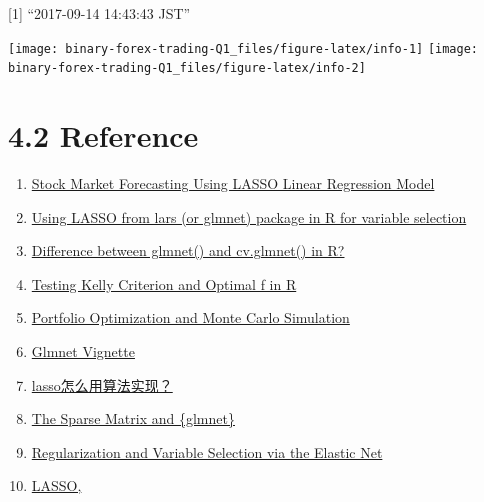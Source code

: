 \documentclass[]{tufte-book}
\providecommand{\tightlist}{%
  \setlength{\itemsep}{0pt}\setlength{\parskip}{0pt}}
\begin{document}
{[}1{]} ``2017-09-14 14:43:43 JST''

\texttt{[image: binary-forex-trading-Q1\_files/figure-latex/info-1]}
\texttt{[image: binary-forex-trading-Q1\_files/figure-latex/info-2]}

\section{4.2 Reference}\label{reference}

\begin{enumerate}
\def\labelenumi{\arabic{enumi}.}
\tightlist
\item
  \href{https://github.com/englianhu/binary.com-interview-question/blob/master/reference/Stock\%20Market\%20Forecasting\%20Using\%20LASSO\%20Linear\%20Regression\%20Model.pdf}{{Stock
  Market Forecasting Using LASSO Linear Regression Model}}
\item
  \href{http://stats.stackexchange.com/questions/58531/using-lasso-from-lars-or-glmnet-package-in-r-for-variable-selection?answertab=votes\#tab-top}{{Using
  LASSO from lars (or glmnet) package in R for variable selection}}
\item
  \href{https://stackoverflow.com/questions/29311323/difference-between-glmnet-and-cv-glmnet-in-r?answertab=votes\#tab-top}{{Difference
  between glmnet() and cv.glmnet() in R?}}
\item
  \href{https://alphaism.wordpress.com/2012/04/13/testing-kelly-criterion-and-optimal-f-in-r}{{Testing
  Kelly Criterion and Optimal f in R}} 
\item
  \href{https://github.com/scibrokes/kelly-criterion/blob/master/references/Portfolio\%20Optimization\%20and\%20Monte\%20Carlo\%20Simulation.pdf}{{Portfolio
  Optimization and Monte Carlo Simulation}} 
\item
  \href{https://web.stanford.edu/~hastie/glmnet/glmnet_alpha.html}{{Glmnet
  Vignette}}
\item
  \href{http://cos.name/cn/topic/101533/\#post-418215}{{lasso怎么用算法实现？}}
\item
  \href{http://amunategui.github.io/sparse-matrix-glmnet/}{{The Sparse
  Matrix and \{glmnet\}}}
\item
  \href{https://github.com/englianhu/binary.com-interview-question/blob/master/reference/Regularization\%20and\%20Variable\%20Selection\%20via\%20the\%20Elastic\%20Net.pdf}{{Regularization
  and Variable Selection via the Elastic Net}}
\item
  \href{http://www4.stat.ncsu.edu/~post/josh/LASSO_Ridge_Elastic_Net_-_Examples.html}{{LASSO,
}}
\end{enumerate}
\end{document}
